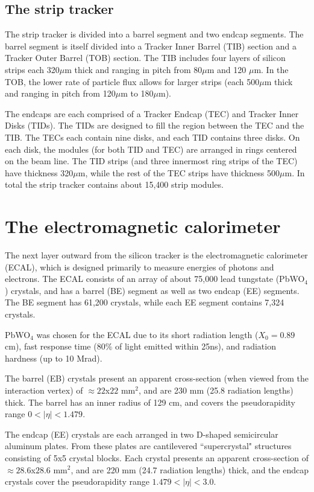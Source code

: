 \subsection{The strip tracker}

The strip tracker is divided into a barrel segment and two endcap segments. The barrel segment is itself divided into a Tracker Inner Barrel (TIB) section and a Tracker Outer Barrel (TOB) section. The TIB includes four layers of silicon strips each 320$\mu$m thick and ranging in pitch from 80$\mu$m and 120 $\mu$m. In the TOB, the lower rate of particle flux allows for larger strips (each 500$\mu$m thick and ranging in pitch from 120$\mu$m to 180$\mu$m).

The endcaps are each comprised of a Tracker Endcap (TEC) and Tracker Inner Disks (TIDs). The TIDs are designed to fill the region between the TEC and the TIB. The TECs each contain nine disks, and each TID contains three disks. On each disk, the modules (for both TID and TEC) are arranged in rings centered on the beam line. The TID strips (and three innermost ring strips of the TEC) have thickness 320$\mu$m, while the rest of the TEC strips have thickness 500$\mu$m. In total the strip tracker contains about 15,400 strip modules.  



\section{The electromagnetic calorimeter}

The next layer outward from the silicon tracker is the electromagnetic calorimeter (ECAL), which is designed primarily to measure energies of photons and electrons. The ECAL consists of an array of about 75,000 lead tungstate (PbWO$_4$) crystals, and has a barrel (BE) segment as well as two endcap (EE) segments. The BE segment has 61,200 crystals, while each EE segment contains 7,324 crystals.

PbWO$_4$ was chosen for the ECAL due to its short radiation length ($X_0 = 0.89$ cm), fast response time ($80\%$ of light emitted within 25ns), and radiation hardness (up to 10 Mrad).

The barrel (EB) crystals present an apparent cross-section (when viewed from the interaction vertex) of $\approx 22$x$22$ mm$^2$, and are 230 mm (25.8 radiation lengths) thick. The barrel has an inner radius of 129 cm, and covers the pseudorapidity range $0 < |\eta| < 1.479$.

The endcap (EE) crystals are each arranged in two D-shaped semicircular aluminum plates. From these plates are cantilevered ``supercrystal" structures consisting of 5x5 crystal blocks. Each crystal presents an apparent cross-section of $\approx 28.6$x$28.6$ mm$^2$, and are 220 mm (24.7 radiation lengths) thick, and the endcap crystals cover the pseudorapidity range $1.479 < |\eta| < 3.0$.

